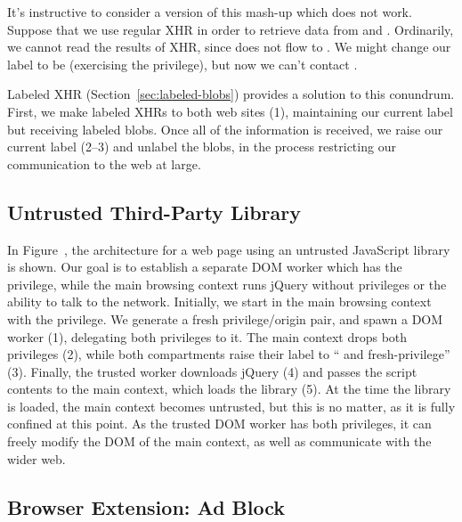 It's instructive to consider a version of this mash-up which does not
work.  Suppose that we use regular XHR in order to retrieve data from
 and .  Ordinarily, we cannot read
the results of XHR, since  does not flow to .
We might change our label to be  (exercising the 
privilege), but now we can't contact .

Labeled XHR (Section~\ref{sec:labeled-blobs}) provides a solution to
this conundrum.  First, we make labeled XHRs to both web sites (1),
maintaining our current label but receiving labeled blobs.  Once all of
the information is received, we raise our current label (2--3) and
unlabel the blobs, in the process restricting our communication to the
web at large.

\subsection{Untrusted Third-Party Library}


In Figure~, the architecture for a web page using an
untrusted JavaScript library is shown.  Our goal is to establish a
separate DOM worker which has the  privilege, while the
main browsing context runs jQuery without privileges or the ability to
talk to the network.  Initially, we start in the main browsing context
with the  privilege.  We generate a fresh privilege/origin
pair, and spawn a DOM worker (1), delegating both privileges to it.  The
main context drops both privileges (2), while both compartments raise
their label to `` and fresh-privilege'' (3).  Finally, the
trusted worker downloads jQuery (4) and passes the script contents to
the main context, which loads the library (5).  At the time the library
is loaded, the main context becomes untrusted, but this is no matter, as
it is fully confined at this point.  As the trusted DOM worker has both
privileges, it can freely modify the DOM of the main context, as well as
communicate with the wider web.

\subsection{Browser Extension: Ad Block}

